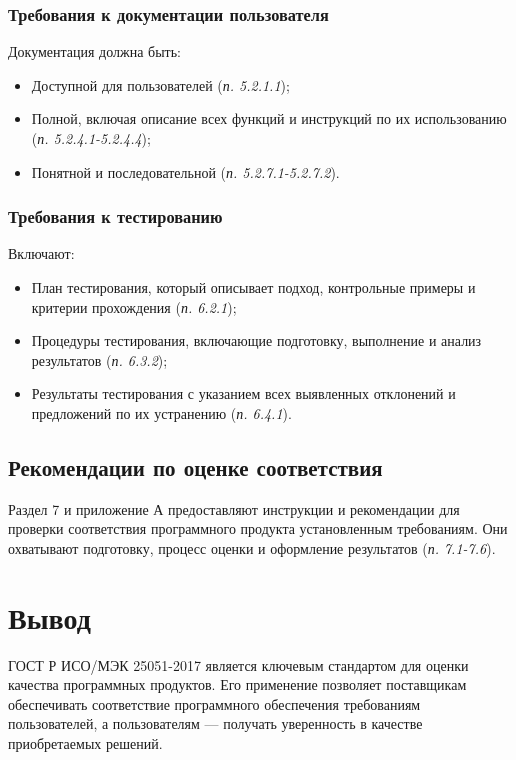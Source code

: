 \subsubsection*{Требования к документации пользователя}
Документация должна быть:
\begin{itemize}
    \item Доступной для пользователей (\textit{п. 5.2.1.1});
    \item Полной, включая описание всех функций и инструкций по их использованию (\textit{п. 5.2.4.1-5.2.4.4});
    \item Понятной и последовательной (\textit{п. 5.2.7.1-5.2.7.2}).
\end{itemize}

\subsubsection*{Требования к тестированию}
Включают:
\begin{itemize}
    \item План тестирования, который описывает подход, контрольные примеры и критерии прохождения (\textit{п. 6.2.1});
    \item Процедуры тестирования, включающие подготовку, выполнение и анализ результатов (\textit{п. 6.3.2});
    \item Результаты тестирования с указанием всех выявленных отклонений и предложений по их устранению (\textit{п. 6.4.1}).
\end{itemize}

\subsection*{Рекомендации по оценке соответствия}
Раздел 7 и приложение А предоставляют инструкции и рекомендации для проверки соответствия программного продукта установленным требованиям.
Они охватывают подготовку, процесс оценки и оформление результатов (\textit{п. 7.1-7.6}).

\section*{Вывод}
ГОСТ Р ИСО/МЭК 25051-2017 является ключевым стандартом для оценки качества программных продуктов.
Его применение позволяет поставщикам обеспечивать соответствие программного обеспечения требованиям пользователей,
а пользователям — получать уверенность в качестве приобретаемых решений.
